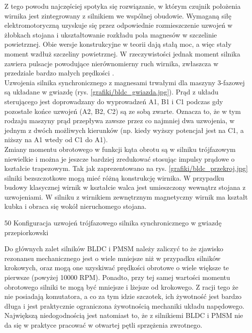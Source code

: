 Z tego powodu najczęściej spotyka się rozwiązanie, w którym czujnik położenia wirnika jest zintegrowany z silnikiem we wspólnej obudowie. Wymaganą siłę elektromotoryczną uzyskuje się przez odpowiednie rozmieszczenie uzwojeń w żłobkach stojana i ukształtowanie rozkładu pola magnesów w szczelinie powietrznej. Obie wersje konstrukcyjne w teorii dają stałą moc, a więc stały moment wzdłuż szczeliny powietrznej. W rzeczywistości jednak moment silnika zawiera pulsacje powodujące nierównomierny ruch wirnika, zwłaszcza w przedziale bardzo małych prędkości \cite{zawirski_pmsm}. \\
		
Uzwojenia silnika synchronicznego z magnesami trwałymi dla maszyny 3-fazowej są układane w gwiazdę (rys. \ref{grafiki/bldc_gwiazda.jpg}). Prąd z układu sterującego jest doprowadzany do wyprowadzeń A1, B1 i C1 podczas gdy pozostałe końce uzwojeń (A2, B2, C2) są ze sobą zwarte. Oznacza to, że w tym rodzaju maszyny prąd przepływa zawsze przez co najmniej dwa uzwojenia, w jednym z dwóch możliwych kierunków (np. kiedy wyższy potencjał jest na C1, a niższy na A1 wtedy od C1 do A1). \\
		
Zmiany momentu obrotowego w funkcji kąta obrotu są w silniku trójfazowym niewielkie i można je jeszcze bardziej zredukować stosując impulsy prądowe o kształcie trapezowym. 
Tak jak zaprezentowano na rys. \ref{grafiki/bldc_przekroj.jpg} silniki bezszczotkowe mogą mieć różną konstrukcję wirnika. W przypadku budowy klasycznej wirnik w kształcie walca jest umieszczony wewnątrz stojana z uzwojeniami. W silniku z wirnikiem zewnętrznym magnetyczny wirnik ma kształt kubka i obraca się wokół nieruchomego stojana. 

		{50}
		{Konfiguracja uzwojeń trójfazowego silnika synchronicznego w gwiazdę}
		{przepiorkowski}

Do głównych zalet silników BLDC i PMSM należy zaliczyć to że zjawisko rezonansu mechanicznego jest o wiele mniejsze niż w przypadku silników krokowych, oraz mogą one uzyskiwać prędkości obrotowe o wiele większe te pierwsze (powyżej 10000 RPM). Ponadto, przy tej samej wartości momentu obrotowego silniki te mogą być mniejsze i lżejsze od krokowego. Z racji tego że nie posiadają komutatora, a co za tym idzie szczotek, ich żywotność jest bardzo długa i jest praktycznie ograniczona żywotnością mechaniki układu napędowego. Największą niedogodnością jest natomiast to, że z silnikiemi BLDC i PMSM nie da się w praktyce pracować w otwartej pętli sprzężenia zwrotnego.



\clearpage

